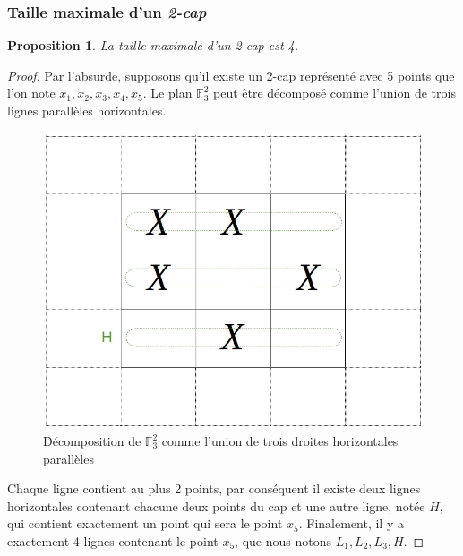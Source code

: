 \documentclass[a4paper,12pt,titlepage]{article}
\theoremstyle{plain}
\newtheorem{prop}{Proposition}
\theoremstyle{definition}
\newcommand{\Ftrois}[1]{\mathbb{F}^#1_3}
\begin{document}
\subsubsection{Taille maximale d'un \emph{2-cap}}
\begin{prop} \label{prop:2cap}
  La taille maximale d'un \emph{2-cap} est 4.
\end{prop}
\begin{proof}  
  Par l'absurde, supposons qu'il existe un 2-cap représenté avec 5 points que l'on note $x_1,x_2,x_3,x_4,x_5$. Le plan $\Ftrois{2}$ peut être décomposé comme l'union de trois lignes parallèles horizontales.

  \begin{figure}[h!] %
    \centering
    \includegraphics[scale=0.4]{FigProp1v2.jpg}
    \caption{Décomposition de $\Ftrois{2}$ comme l'union de trois droites horizontales parallèles}
  \end{figure}

  Chaque ligne contient au plus 2 points, par conséquent il existe deux lignes horizontales contenant chacune deux points du cap et une autre ligne, notée $H$, qui contient exactement un point qui sera le point $x_5$. Finalement, il y a exactement 4 lignes contenant le point $x_5$, que nous notons $L_1,L_2,L_3,H$. %


\end{proof}
\end{document}
